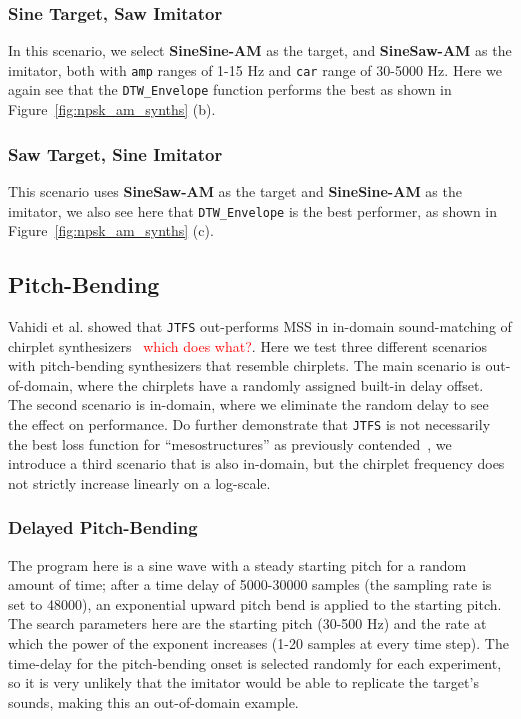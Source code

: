 \documentclass[runningheads]{llncs}
\newcommand{\todo}[1]{\textcolor{red}{#1}}
\newcommand{\JTFS}{\texttt{JTFS}\xspace}
\newcommand{\DTWEnv}{\texttt{DTW\_Envelope}\xspace}
\newcommand{\FMMod}{\textbf{SineSaw-AM}\xspace}
\newcommand{\FMModvtwo}{\textbf{SineSine-AM}\xspace}
\begin{document}
\subsubsection{Sine Target, Saw Imitator}
\label{sec:am_sinetarget_sawimitate}
In this scenario, we select \FMModvtwo as the target, and \FMMod as the imitator, both with \texttt{amp} ranges of 1-15 Hz and \texttt{car} range of 30-5000 Hz. Here we again see that the \DTWEnv function performs the best as shown in Figure~\ref{fig:npsk_am_synths} (b).


\subsubsection{Saw Target, Sine Imitator}
\label{sec:am_sawtarget_sineimitate}
This scenario uses \FMMod as the target and \FMModvtwo as the imitator, we also see here that \DTWEnv is the best performer, as shown in Figure~\ref{fig:npsk_am_synths} (c).





\subsection{Pitch-Bending}
Vahidi et al. showed that \JTFS out-performs MSS in in-domain sound-matching of chirplet synthesizers~\cite{vahidi2023mesostructures} \todo{which does what?}. Here we test three different scenarios with pitch-bending synthesizers that resemble chirplets. The main scenario is out-of-domain, where the chirplets have a randomly assigned built-in delay offset. The second scenario is in-domain, where we eliminate the random delay to see the effect on performance. Do further demonstrate that \JTFS is not necessarily the best loss function for ``mesostructures'' as previously contended~\cite{vahidi2023mesostructures}, we introduce a third scenario that is also in-domain, but the chirplet frequency does not strictly increase linearly on a log-scale.


\subsubsection{Delayed Pitch-Bending}
The program here is a sine wave with a steady starting pitch for a random amount of time; after a time delay of 5000-30000 samples (the sampling rate is set to 48000), an exponential upward pitch bend is applied to the starting pitch. The search parameters here are the starting pitch (30-500 Hz) and the rate at which the power of the exponent increases (1-20 samples at every time step). The time-delay for the pitch-bending onset is selected randomly for each experiment, so it is very unlikely that the imitator would be able to replicate the target's sounds, making this an out-of-domain example.
\end{document}
